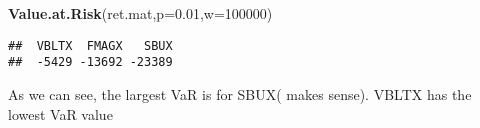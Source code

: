 \documentclass[]{article}
\newenvironment{Shaded}{\begin{snugshade}}{\end{snugshade}}
\newcommand{\KeywordTok}[1]{\textcolor[rgb]{0.13,0.29,0.53}{\textbf{#1}}}
\newcommand{\DataTypeTok}[1]{\textcolor[rgb]{0.13,0.29,0.53}{#1}}
\newcommand{\DecValTok}[1]{\textcolor[rgb]{0.00,0.00,0.81}{#1}}
\newcommand{\FloatTok}[1]{\textcolor[rgb]{0.00,0.00,0.81}{#1}}
\newcommand{\NormalTok}[1]{#1}
\begin{document}
\begin{Shaded}
\begin{Highlighting}[]
\KeywordTok{Value.at.Risk}\NormalTok{(ret.mat,}\DataTypeTok{p=}\FloatTok{0.01}\NormalTok{,}\DataTypeTok{w=}\DecValTok{100000}\NormalTok{)}
\end{Highlighting}
\end{Shaded}

\begin{verbatim}
##  VBLTX  FMAGX   SBUX 
##  -5429 -13692 -23389
\end{verbatim}

As we can see, the largest VaR is for SBUX( makes sense). VBLTX has the
lowest VaR value
\end{document}
